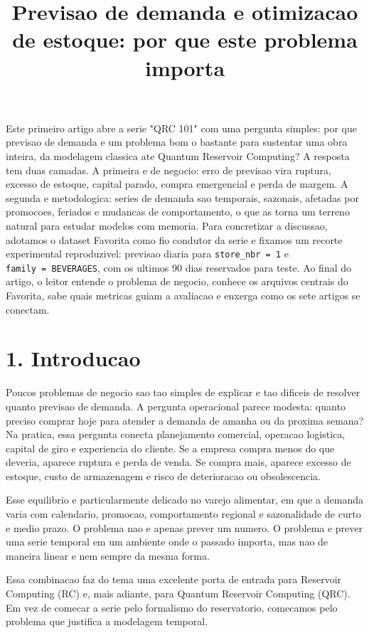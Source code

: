 \documentclass[12pt]{article}
\title{Previsao de demanda e otimizacao de estoque: por que este problema importa}
\author{}
\begin{document}
\maketitle

\begin{resumo}
Este primeiro artigo abre a serie "QRC 101" com uma pergunta simples: por que previsao de demanda e um problema bom o bastante para sustentar uma obra inteira, da modelagem classica ate Quantum Reservoir Computing? A resposta tem duas camadas. A primeira e de negocio: erro de previsao vira ruptura, excesso de estoque, capital parado, compra emergencial e perda de margem. A segunda e metodologica: series de demanda sao temporais, sazonais, afetadas por promocoes, feriados e mudancas de comportamento, o que as torna um terreno natural para estudar modelos com memoria. Para concretizar a discussao, adotamos o dataset Favorita como fio condutor da serie e fixamos um recorte experimental reproduzivel: previsao diaria para \texttt{store\_nbr\ =\ 1} e \texttt{family\ =\ BEVERAGES}, com os ultimos 90 dias reservados para teste. Ao final do artigo, o leitor entende o problema de negocio, conhece os arquivos centrais do Favorita, sabe quais metricas guiam a avaliacao e enxerga como os sete artigos se conectam.
\end{resumo}

\section{1. Introducao}\label{1-introducao}

Poucos problemas de negocio sao tao simples de explicar e tao dificeis de resolver quanto previsao de demanda. A pergunta operacional parece modesta: quanto preciso comprar hoje para atender a demanda de amanha ou da proxima semana? Na pratica, essa pergunta conecta planejamento comercial, operacao logistica, capital de giro e experiencia do cliente. Se a empresa compra menos do que deveria, aparece ruptura e perda de venda. Se compra mais, aparece excesso de estoque, custo de armazenagem e risco de deterioracao ou obsolescencia.

Esse equilibrio e particularmente delicado no varejo alimentar, em que a demanda varia com calendario, promocao, comportamento regional e sazonalidade de curto e medio prazo. O problema nao e apenas prever um numero. O problema e prever uma serie temporal em um ambiente onde o passado importa, mas nao de maneira linear e nem sempre da mesma forma.

Essa combinacao faz do tema uma excelente porta de entrada para Reservoir Computing (RC) e, mais adiante, para Quantum Reservoir Computing (QRC). Em vez de comecar a serie pelo formalismo do reservatorio, comecamos pelo problema que justifica a modelagem temporal.
\end{document}
